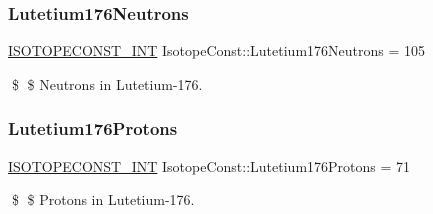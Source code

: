 \subsubsection{\texorpdfstring{Lutetium176\+Neutrons}{Lutetium176Neutrons}}
{\footnotesize\ttfamily \mbox{\hyperlink{group___isotope_const-_macros_ga5f18360b3e99483a35c32d789e62621c}{I\+S\+O\+T\+O\+P\+E\+C\+O\+N\+S\+T\+\_\+\+I\+NT}} Isotope\+Const\+::\+Lutetium176\+Neutrons = 105}

\$ \$ Neutrons in Lutetium-\/176. \mbox{\label{group___isotope_const-_lutetium-_lu176_ga16c9b5e57dd9b9e4b49b7e50fdb9af0a}} 
\subsubsection{\texorpdfstring{Lutetium176\+Protons}{Lutetium176Protons}}
{\footnotesize\ttfamily \mbox{\hyperlink{group___isotope_const-_macros_ga5f18360b3e99483a35c32d789e62621c}{I\+S\+O\+T\+O\+P\+E\+C\+O\+N\+S\+T\+\_\+\+I\+NT}} Isotope\+Const\+::\+Lutetium176\+Protons = 71}

\$ \$ Protons in Lutetium-\/176. 